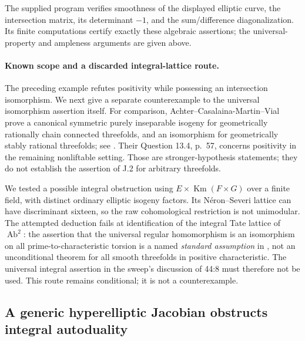 The supplied program verifies smoothness of the displayed elliptic
curve, the intersection matrix, its determinant $-1$, and the
sum/difference diagonalization.  Its finite computations certify
exactly these algebraic assertions; the universal-property and
ampleness arguments are given above.

\paragraph{Known scope and a discarded integral-lattice route.}
The preceding example refutes positivity while possessing an
intersection isomorphism.  We next give a separate counterexample
to the universal isomorphism assertion itself.
For comparison, Achter--Casalaina-Martin--Vial prove a canonical
symmetric purely inseparable isogeny for geometrically rationally
chain connected threefolds, and an isomorphism for geometrically
stably rational threefolds; see \cite[Theorem 1, p.~6 and
Theorem 12.12, p.~54]{DGJ_ACMVDiagonal2025}.  Their Question 13.4,
p.~57, concerns positivity in the remaining nonliftable setting.
Those are stronger-hypothesis statements; they do not establish
the assertion of J.2 for arbitrary threefolds.

We tested a possible integral obstruction using
$E\times\operatorname{Km}(F\times G)$ over a finite field,
with distinct ordinary elliptic isogeny factors.  Its
Néron--Severi lattice can have discriminant sixteen, so the raw
cohomological restriction is not unimodular.  The attempted
deduction fails at identification of the integral Tate lattice
of $\operatorname{Ab}^2$: the assertion that the universal regular
homomorphism is an isomorphism on all prime-to-characteristic
torsion is a named \emph{standard assumption} in
\cite[Definition 6, p.~4; Proposition 3.8, p.~17]{DGJ_ACMVBloch},
not an unconditional theorem for all smooth threefolds in
positive characteristic.  The universal integral assertion in
the sweep's discussion of 44:8 must therefore not be used.
This route remains conditional; it is not a counterexample.


\subsection{A generic hyperelliptic Jacobian obstructs integral autoduality}
